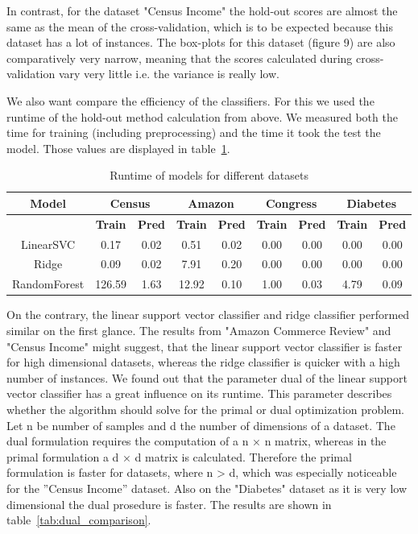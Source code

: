 \documentclass[a4paper,10pt]{article}
\begin{document}
In contrast, for the dataset 
"Census Income" the hold-out scores are almost the same as the mean of the cross-validation, which is to be
expected because this dataset has a lot of instances. The box-plots for this dataset (figure 9) are also
comparatively very narrow, meaning that the scores calculated during cross-validation vary very little i.e.
the variance is really low.




We also want compare the efficiency of the classifiers. For this we used the runtime of the hold-out
method calculation from above. We measured both the time for training (including preprocessing) and
the time it took the test the model. Those values are displayed in table~\ref{tab:runtime_models}.


\begin{table}[h!]
\centering
\footnotesize
\begin{tabular}{|c|c|c|c|c|c|c|c|c|}
\hline
\textbf{Model} & \multicolumn{2}{c|}{Census} & \multicolumn{2}{c|}{Amazon} & \multicolumn{2}{c|}{Congress} & \multicolumn{2}{c|}{Diabetes} \\
\hline
& \textbf{Train} & \textbf{Pred} & \textbf{Train} & \textbf{Pred} & \textbf{Train} & \textbf{Pred} & \textbf{Train} & \textbf{Pred} \\
\hline
LinearSVC & 0.17 & 0.02 & 0.51 & 0.02 & 0.00 & 0.00 & 0.00 & 0.00 \\
\hline
Ridge & 0.09 & 0.02 & 7.91 & 0.20 & 0.00 & 0.00 & 0.00 & 0.00 \\
\hline
RandomForest & 126.59 & 1.63 & 12.92 & 0.10 & 1.00 & 0.03 & 4.79 & 0.09 \\
\hline
\end{tabular}
\vspace{0.3cm}
\caption{Runtime of models for different datasets}
\label{tab:runtime_models}
\end{table}




On the contrary, the linear support vector classifier and ridge classifier performed similar
on the first glance. The results from "Amazon Commerce Review" and "Census Income" might suggest,
that the linear support vector classifier is faster for high dimensional datasets, whereas the ridge classifier
is quicker with a high number of instances. We found out that the parameter dual of the linear support
vector classifier has a great influence on its runtime. This parameter describes whether the algorithm
should solve for the primal or dual optimization problem. Let n be number of samples and d the number
of dimensions of a dataset. The dual formulation requires the computation of a n × n matrix, whereas
in the primal formulation a d × d matrix is calculated. Therefore the primal formulation is faster for
datasets, where n > d, which was especially noticeable for the ”Census Income” dataset. Also on the "Diabetes"
dataset as it is very low dimensional the dual prosedure is faster. The results are shown in table~\ref{tab:dual_comparison}.
\end{document}
